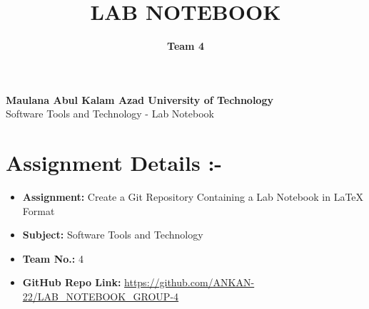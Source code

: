 \documentclass[a4paper,15pt]{article}
\title{\textbf{LAB NOTEBOOK}}
\author{\textbf{Team 4}}
\date{}
\begin{document}
\maketitle


\begin{center}
    \Large\textbf{Maulana Abul Kalam Azad University of Technology}\\
    \vspace{0.2cm}
    \large Software Tools and Technology - Lab Notebook
\end{center}

\vspace{1cm}

\section*{Assignment Details :-}
\begin{itemize}[leftmargin=1.5cm]
    \item \textbf{Assignment:} Create a Git Repository Containing a Lab Notebook in LaTeX Format
    \item \textbf{Subject:} Software Tools and Technology
    \item \textbf{Team No.:} 4
    \item \textbf{GitHub Repo Link:} \url{https://github.com/ANKAN-22/LAB_NOTEBOOK_GROUP-4}
\end{itemize}

\vspace{1cm}
\end{document}
